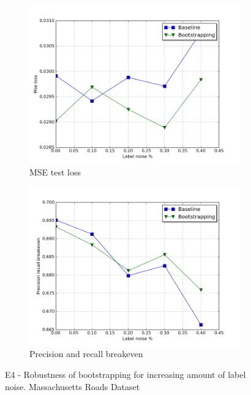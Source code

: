 \begin{figure}
\begin{subfigure}{0.48\textwidth}
\includegraphics[width=\linewidth]{figs/E3/E3_lc_noise.png}
\caption{MSE test loss} \label{fig:E3_boot_mass_loss}
\end{subfigure}
\hspace*{\fill} %
\begin{subfigure}{0.48\textwidth}
\includegraphics[width=\linewidth]{figs/E3/E3_pr_noise.png}
\caption{Precision and recall breakeven} \label{fig:E3_boot_mass_pr}
\end{subfigure}
\hspace*{\fill} %
\caption{E4 - Robustness of bootstrapping for increasing amount of label noise. Massachusetts Roads Dataset} \label{fig:E3_boot_mass}
\end{figure}

